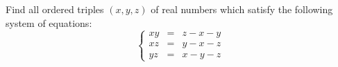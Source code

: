 Find all ordered triples $ (x,y,z)$ of real numbers which satisfy the following system of equations:\[ \left\{\begin{array}{rcl} xy & = & z - x - y \\
xz & = & y - x - z \\
yz & = & x - y - z \end{array} \right.
\]
